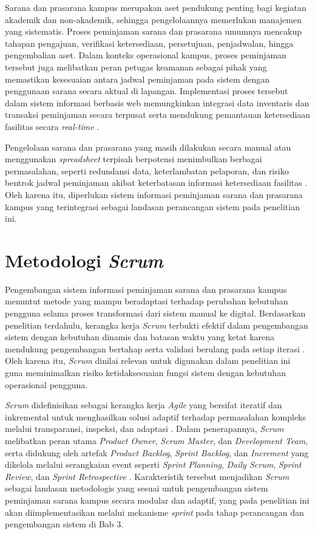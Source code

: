 Sarana dan prasarana kampus merupakan aset pendukung penting bagi kegiatan akademik dan non-akademik, sehingga pengelolaannya memerlukan manajemen yang sistematis. Proses peminjaman sarana dan prasarana umumnya mencakup tahapan pengajuan, verifikasi ketersediaan, persetujuan, penjadwalan, hingga pengembalian aset. Dalam konteks operasional kampus, proses peminjaman tersebut juga melibatkan peran petugas keamanan sebagai pihak yang memastikan kesesuaian antara jadwal peminjaman pada sistem dengan penggunaan sarana secara aktual di lapangan. Implementasi proses tersebut dalam sistem informasi berbasis web memungkinkan integrasi data inventaris dan transaksi peminjaman secara terpusat serta mendukung pemantauan ketersediaan fasilitas secara \textit{real-time} \parencite{PutriNabella2025}.

Pengelolaan sarana dan prasarana yang masih dilakukan secara manual atau menggunakan \textit{spreadsheet} terpisah berpotensi menimbulkan berbagai permasalahan, seperti redundansi data, keterlambatan pelaporan, dan risiko bentrok jadwal peminjaman akibat keterbatasan informasi ketersediaan fasilitas \parencite{Herlambang2020}. Oleh karena itu, diperlukan sistem informasi peminjaman sarana dan prasarana kampus yang terintegrasi sebagai landasan perancangan sistem pada penelitian ini.

\section{Metodologi \textit{Scrum}}
Pengembangan sistem informasi peminjaman sarana dan prasarana kampus menuntut metode yang mampu beradaptasi terhadap perubahan kebutuhan pengguna selama proses transformasi dari sistem manual ke digital. Berdasarkan penelitian terdahulu, kerangka kerja \textit{Scrum} terbukti efektif dalam pengembangan sistem dengan kebutuhan dinamis dan batasan waktu yang ketat karena mendukung pengembangan bertahap serta validasi berulang pada setiap iterasi \parencite{Rifky2022, Velasquez-Jimenez2025}. Oleh karena itu, \textit{Scrum} dinilai relevan untuk digunakan dalam penelitian ini guna meminimalkan risiko ketidaksesuaian fungsi sistem dengan kebutuhan operasional pengguna.

\textit{Scrum} didefinisikan sebagai kerangka kerja \textit{Agile} yang bersifat iteratif dan inkremental untuk menghasilkan solusi adaptif terhadap permasalahan kompleks melalui transparansi, inspeksi, dan adaptasi \parencite{Schwaber2012}. Dalam penerapannya, \textit{Scrum} melibatkan peran utama \textit{Product Owner}, \textit{Scrum Master}, dan \textit{Development Team}, serta didukung oleh artefak \textit{Product Backlog}, \textit{Sprint Backlog}, dan \textit{Increment} yang dikelola melalui serangkaian event seperti \textit{Sprint Planning}, \textit{Daily Scrum}, \textit{Sprint Review}, dan \textit{Sprint Retrospective} \parencite{permana2015scrum, Nugraha2021}. Karakteristik tersebut menjadikan \textit{Scrum} sebagai landasan metodologis yang sesuai untuk pengembangan sistem peminjaman sarana kampus secara modular dan adaptif, yang pada penelitian ini akan diimplementasikan melalui mekanisme \textit{sprint} pada tahap perancangan dan pengembangan sistem di Bab 3.

